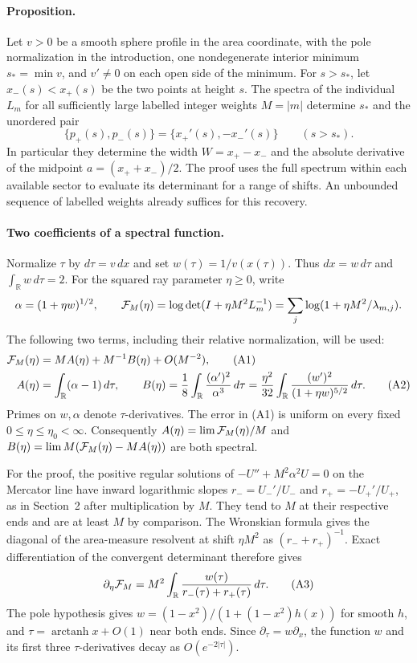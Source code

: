 \documentclass[11pt,letterpaper]{article}
\begin{document}
\paragraph{Proposition.}
Let \(v>0\) be a smooth sphere profile in the area coordinate, with the
pole normalization in the introduction, one nondegenerate interior
minimum \(s_*=\min v\), and \(v'\ne0\) on each open side of the minimum.
For \(s>s_*\), let \(x_-(s)<x_+(s)\) be the two points at height \(s\).
The spectra of the individual \(L_m\) for all sufficiently large labelled
integer weights \(M=|m|\) determine \(s_*\) and the unordered pair
\[
 \{p_+(s),p_-(s)\}=\{x_+'(s),-x_-'(s)\}\qquad (s>s_*).
\]
In particular they determine the width \(W=x_+-x_-\) and the absolute
derivative of the midpoint \(a=(x_++x_-)/2\). The proof uses the full
spectrum within each available sector to evaluate its determinant for
a range of shifts. An unbounded sequence of labelled weights already
suffices for this recovery.

\paragraph{Two coefficients of a spectral function.}
Normalize \(\tau\) by \(d\tau=v\,dx\) and set \(w(\tau)=1/v(x(\tau))\).
Thus \(dx=w\,d\tau\) and \(\int_{\mathbb R}w\,d\tau=2\).
For the squared ray parameter \(\eta\geq0\), write
\[
 \alpha=(1+\eta w)^{1/2},\qquad
 {\cal F}_M(\eta)=\log\det(I+\eta M^2 L_m^{-1})
     =\sum_j\log(1+\eta M^2/\lambda_{m,j}).
\]
The following two terms, including their relative normalization, will
be used:
\begin{align}
 {\cal F}_M(\eta)&=M A(\eta)+M^{-1}B(\eta)+O(M^{-2}), \tag{A1}\\
 A(\eta)&=\int_{\mathbb R}(\alpha-1)\,d\tau,\qquad
 B(\eta)=\frac18\int_{\mathbb R}\frac{(\alpha')^2}{\alpha^3}\,d\tau
   =\frac{\eta^2}{32}\int_{\mathbb R}
          \frac{(w')^2}{(1+\eta w)^{5/2}}\,d\tau . \tag{A2}
\end{align}
Primes on \(w,\alpha\) denote \(\tau\)-derivatives. The error in (A1)
is uniform on every fixed \(0\leq\eta\leq\eta_0<\infty\).
Consequently \(A(\eta)=\lim {\cal F}_M(\eta)/M\) and
\(B(\eta)=\lim M({\cal F}_M(\eta)-MA(\eta))\) are both spectral.

For the proof, the positive regular solutions of
\(-U''+M^2\alpha^2 U=0\) on the Mercator line have inward logarithmic
slopes \(r_-=U_-'/U_-\) and \(r_+=-U_+'/U_+\), as in Section~2 after
multiplication by \(M\). They tend to \(M\) at their respective ends
and are at least \(M\) by comparison. The Wronskian formula gives the
diagonal of the area-measure resolvent at shift \(\eta M^2\) as
\((r_-+r_+)^{-1}\). Exact differentiation of the convergent determinant
therefore gives
\[
   \partial_\eta {\cal F}_M=M^2
      \int_{\mathbb R}\frac{w(\tau)}{r_-(\tau)+r_+(\tau)}\,d\tau .
   \tag{A3}
\]
The pole hypothesis gives \(w=(1-x^2)/(1+(1-x^2)h(x))\) for smooth
\(h\), and \(\tau=\operatorname{arctanh}x+O(1)\) near both ends.
Since \(\partial_\tau=w\partial_x\), the function \(w\) and its first
three \(\tau\)-derivatives decay as \(O(e^{-2|\tau|})\).
\end{document}
